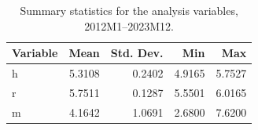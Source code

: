 \begin{table}[H]
\centering
\caption{Summary statistics for the analysis variables, 2012M1--2023M12.}
\label{tab:summary_stats}
\begin{tabular}{lrrrr}
\toprule
Variable & Mean & Std. Dev. & Min & Max \\
\midrule
h & 5.3108 & 0.2402 & 4.9165 & 5.7527 \\
r & 5.7511 & 0.1287 & 5.5501 & 6.0165 \\
m & 4.1642 & 1.0691 & 2.6800 & 7.6200 \\
\bottomrule
\end{tabular}
\end{table}
